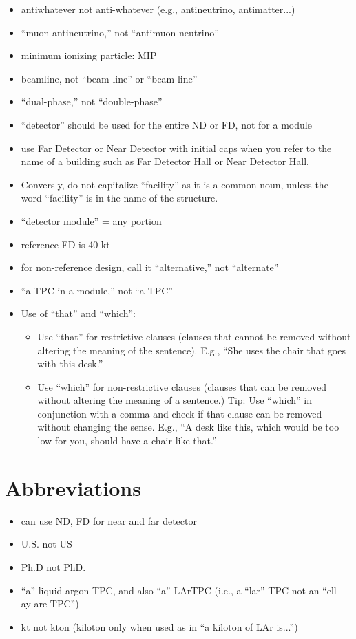 \begin{itemize}
\item antiwhatever not anti-whatever (e.g., antineutrino, antimatter...)
\item ``muon antineutrino,'' not ``antimuon neutrino''
\item minimum ionizing particle: MIP
\item beamline, not ``beam line'' or ``beam-line''
\item ``dual-phase,'' not ``double-phase''
\item ``detector'' should be used for the entire ND or FD, not for a module
\item use Far Detector or Near Detector with initial caps when you refer to the name of a building such as Far Detector Hall or Near Detector Hall. \item Conversly, do not capitalize ``facility'' as it is a common noun, unless the word ``facility'' is in the name of the structure.
\item ``detector module'' = any  portion
\item reference FD is 40 kt
\item for non-reference design, call it ``alternative,'' not ``alternate''
\item ``a TPC in a   module,'' not ``a   TPC'' 
\item Use of ``that'' and ``which'': 
\begin{itemize}
\item Use ``that'' for restrictive clauses (clauses that cannot be removed without altering the meaning of the sentence). E.g., ``She uses the chair that goes with this desk.''
\item Use ``which'' for non-restrictive clauses (clauses that can be removed without altering the meaning of a sentence.) Tip: Use ``which'' in conjunction with a comma and check if that clause can be removed without changing the sense.  E.g., ``A desk like this, which would be too low for you, should have a chair like that.''
\end{itemize}
\end{itemize}

\section{Abbreviations}
\label{sec:abbrevs}

\begin{itemize}
\item can use ND, FD for near and far detector
\item U.S. not US
\item Ph.D not PhD.
\item ``a'' liquid argon TPC, and also ``a'' LArTPC (i.e., a ``lar'' TPC not an ``ell-ay-are-TPC'') 
\item kt not kton (kiloton only when used as in ``a kiloton of LAr is...'') 

\end{itemize}

